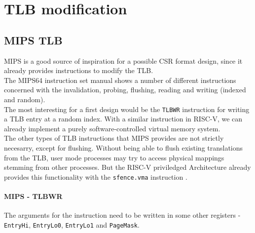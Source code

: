%
\section{TLB modification}

\subsection{MIPS TLB} %

MIPS is a good source of inspiration for a possible CSR format design, since it already provides
instructions to modify the TLB.\\
The MIPS64 instruction set manual \cite{MIPSArchitectureProgrammers2016}
shows a number of different instructions concerned with the invalidation, probing, flushing, reading
and writing (indexed and random).\\
The most interesting for a first design would be the \texttt{TLBWR} instruction for writing a TLB
entry at a random index. With a similar instruction in RISC-V, we can already implement a purely
software-controlled virtual memory system.\\
The other types of TLB instructions that MIPS provides are not strictly necesarry,
except for flushing. Without being able to flush existing translations from the TLB,
user mode processes may try to access physical mappings stemming from other processes.
But the RISC-V priviledged Architecture already provides this functionality
with the \texttt{sfence.vma} instruction \cite{riscvreader}.

\paragraph{MIPS - TLBWR} The arguments for the instruction need to be written in some
other registers - \texttt{EntryHi}, \texttt{EntryLo0}, \texttt{EntryLo1} and \texttt{PageMask}.


